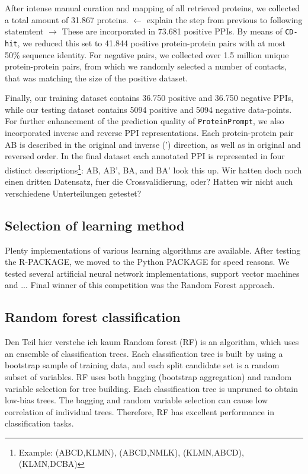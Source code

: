 \documentclass[preprint,3p,times,twocolumn]{elsarticle}
\newcommand{\TODO}[1] {\begingroup\color{red}#1\endgroup}
\newcommand{\tool}{\texttt{ProteinPrompt}\hspace{2pt}}
\begin{document}
After intense manual curation and mapping of all retrieved proteins, we collected a total amount of 31.867 proteins. \TODO{$\leftarrow$ explain the step from previous to following statemtent $\rightarrow$} These are incorporated in 73.681 positive PPIs. By means of \texttt{CD-hit}, we reduced this set to 41.844 positive protein-protein pairs with at most 50\% sequence identity. For negative pairs, we collected over 1.5 million unique protein-protein pairs, from which we randomly selected a number of contacts, that was matching the size of the positive dataset.

Finally, our training dataset contains 36.750 positive and 36.750 negative PPIs, while our testing dataset contains 5094 positive and 5094 negative data-points. For further enhancement of the prediction quality of \tool, we also incorporated inverse and reverse PPI representations.
Each protein-protein pair AB is described in the original and inverse (') direction, as well as in original and reversed order.
In the final dataset each annotated PPI is represented in four distinct descriptions\footnote{Example: (ABCD,KLMN), (ABCD,NMLK), (KLMN,ABCD), (KLMN,DCBA)}: 
AB, AB', BA, and BA'
\TODO{look this up}.
\TODO{Wir hatten doch noch einen dritten Datensatz, fuer die Crossvalidierung, oder? Hatten wir nicht auch verschiedene Unterteilungen getestet?} 

\subsection{Selection of learning method}
Plenty implementations of various learning algorithms are available. After testing the \TODO{R-PACKAGE}, we moved to the Python \TODO{PACKAGE} for speed reasons. We tested several artificial neural network implementations, support vector machines and ...
Final winner of this competition was the Random Forest approach. 

\subsection{Random forest classification}
\TODO{Den Teil hier verstehe ich kaum}
Random forest (RF) is an algorithm, which uses an ensemble of classification trees. Each classification tree is built by using a bootstrap sample of training data, and each split candidate set is a random subset of variables. RF uses both bagging (bootstrap aggregation) and random variable selection for tree building. Each classification tree is unpruned to obtain low-bias trees. The bagging and random variable selection can cause low correlation of individual trees. Therefore, RF has excellent performance in classification tasks.
\end{document}
